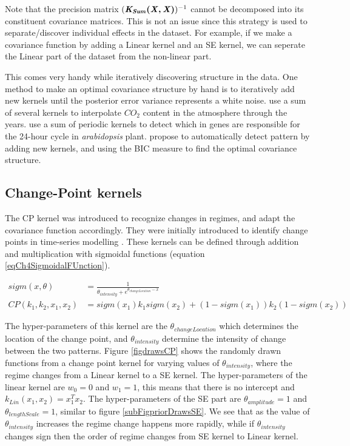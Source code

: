 Note that the precision matrix $( \bm{\mathit{K_{Sum}(X, X)}} )^{-1}$ cannot be decomposed into its constituent covariance matrices. This is not an issue since this strategy is used to separate/discover individual effects in the dataset. For example, if we make a covariance function by adding a Linear kernel and an SE kernel, we can seperate the Linear part of the dataset from the non-linear part. 

This comes very handy while iteratively discovering structure in the data. One method to make an optimal covariance structure by hand is to iteratively add new kernels until the posterior error variance represents a white noise. \cite{Rasmussen2005} use a sum of several kernels to interpolate $CO_{2}$ content in the atmosphere through the years. \cite{durrande2013gaussian} use a sum of periodic kernels to detect which in genes are responsible for the 24-hour cycle in \textit{arabidopsis} plant. \cite{duvenaud2013structure, lloyd2014automatic} propose to automatically detect pattern by adding new kernels, and using the BIC measure to find the optimal covariance structure. 

\subsection{Change-Point kernels}\label{subSecCh4CPKernel}
The CP kernel was introduced to recognize changes in regimes, and adapt the covariance function accordingly. They were initially introduced to identify change points in time-series modelling \cite{osborne2010bayesian, saatcci2010gaussian}. These kernels can be defined through addition and multiplication with sigmoidal functions (equation \ref{eqCh4SigmoidalFUnction}). 

\begin{align}
sigm(x, \theta) & = \frac{1}{\theta_{intensity} + e^{\theta_{changeLocation}-x}} \label{eqCh4SigmoidalFUnction} \\
CP(k_{1}, k_{2}, x_{1}, x_{2}) & = sigm(x_{1})k_{1}sigm(x_{2}) + (1-sigm(x_{1}))k_{2}(1-sigm(x_{2})) \label{eq:changePointKernel}
\end{align}

The hyper-parameters of this kernel are the $\theta_{changeLocation}$ which determines the location of the change point, and $\theta_{intensity}$ determine the intensity of change between the two patterns. Figure \ref{figdrawsCP} shows the randomly drawn functions from a change point kernel for varying values of $\theta_{intensity}$, where the regime changes from a Linear kernel to a SE kernel. The hyper-parameters of the linear kernel are $w_{0}=0$ and $w_{1}=1$, this means that there is no intercept and $k_{Lin}(x_{1}, x_{2}) = x_{1}^T x_{2}$. The hyper-parameters of the SE part are $\theta_{amplitude}=1$ and $\theta_{lengthScale}=1$, similar to figure \ref{subFigpriorDrawsSE}. We see that as the value of $\theta_{intensity}$ increases the regime change happens more rapidly, while if $\theta_{intensity}$ changes sign then the order of regime changes from SE kernel to Linear kernel.

